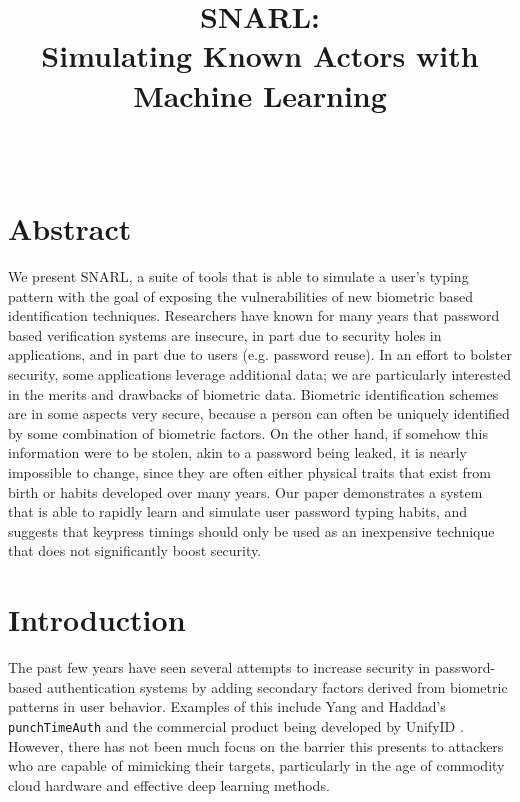 \documentclass[9pt,journal]{IEEEtran}
\title{SNARL:\\Simulating Known Actors with Machine Learning}
\author{\IEEEauthorblockN{Bryan Cai, Yasyf Mohamedali}\\\IEEEauthorblockA{\{bcai, yasyf\}@mit.edu}}
\begin{document}
\maketitle

\section{Abstract}

We present SNARL, a suite of tools that is able to simulate a user's typing pattern with the goal of exposing the vulnerabilities of new biometric based identification techniques. Researchers have known for many years that password based verification systems are insecure, in part due to security holes in applications, and in part due to users (e.g. password reuse). In an effort to bolster security, some applications leverage additional data; we are particularly interested in the merits and drawbacks of biometric data. Biometric identification schemes are in some aspects very secure, because a person can often be uniquely identified by some combination of biometric factors. On the other hand, if somehow this information were to be stolen, akin to a password being leaked, it is nearly impossible to change, since they are often either physical traits that exist from birth or habits developed over many years. Our paper demonstrates a system that is able to rapidly learn and simulate user password typing habits, and suggests that keypress timings should only be used as an inexpensive technique that does not significantly boost security.

\section{Introduction}

The past few years have seen several attempts to increase security in password-based authentication systems by adding secondary factors derived from biometric patterns in user behavior. Examples of this include Yang and Haddad's \texttt{punchTimeAuth} \cite{punchtimeauth} and the commercial product being developed by UnifyID \cite{unifyid}. However, there has not been much focus on the barrier this presents to attackers who are capable of mimicking their targets, particularly in the age of commodity cloud hardware and effective deep learning methods.
\end{document}
